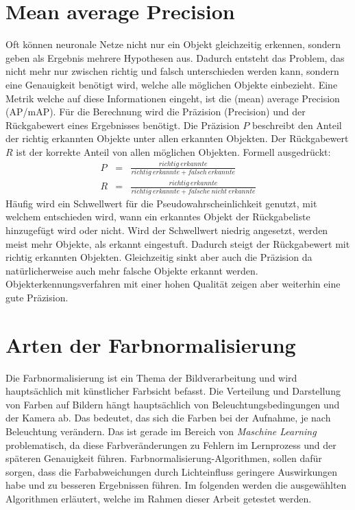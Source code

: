   \section{Mean average Precision}\label{s.map}
Oft können neuronale Netze nicht nur ein Objekt gleichzeitig erkennen, sondern geben als Ergebnis mehrere Hypothesen aus. Dadurch entsteht das Problem, das nicht mehr nur zwischen richtig und falsch unterschieden werden kann, sondern eine Genauigkeit benötigt wird, welche alle möglichen Objekte einbezieht. Eine Metrik welche auf diese Informationen eingeht, ist die (mean) average Precision (AP/mAP). Für die Berechnung wird die Präzision (Precision) und der Rückgabewert eines Ergebnisses benötigt. Die Präzision $P$ beschreibt den Anteil der richtig erkannten Objekte unter allen erkannten Objekten. Der Rückgabewert $R$ ist der korrekte Anteil von allen möglichen Objekten. Formell ausgedrückt:
\begin{eqnarray}
P&=&\frac{richtig\medspace erkannte}{richtig\medspace erkannte + falsch\medspace erkannte}\\
R&=&\frac{richtig\medspace erkannte}{richtig\medspace erkannte + falsche\medspace nicht\medspace erkannte}
\end{eqnarray}
Häufig wird ein Schwellwert für die Pseudowahrscheinlichkeit genutzt, mit welchem entschieden wird, wann ein erkanntes Objekt der Rückgabeliste hinzugefügt wird oder nicht. Wird der Schwellwert niedrig angesetzt, werden meist mehr Objekte, als erkannt eingestuft. Dadurch steigt der Rückgabewert mit richtig erkannten Objekten. Gleichzeitig sinkt aber auch die Präzision da natürlicherweise auch mehr falsche Objekte erkannt werden. Objekterkennungsverfahren mit einer hohen Qualität zeigen aber weiterhin eine gute Präzision.
\section{Arten der Farbnormalisierung}\label{s.farbnormalisierungen}
Die Farbnormalisierung ist ein Thema der Bildverarbeitung und wird hauptsächlich mit künstlicher Farbsicht befasst. Die Verteilung und Darstellung von Farben auf Bildern hängt hauptsächlich von Beleuchtungsbedingungen und der Kamera ab. Das bedeutet, das sich die Farben bei der Aufnahme, je nach Beleuchtung verändern. Das ist gerade im Bereich von \textit{Maschine Learning} problematisch, da diese Farbveränderungen zu Fehlern im Lernprozess und der späteren Genauigkeit führen. Farbnormalisierung-Algorithmen, sollen dafür sorgen, dass die Farbabweichungen durch Lichteinfluss geringere Auswirkungen habe und zu besseren Ergebnissen führen. Im folgenden werden die ausgewählten Algorithmen erläutert, welche im Rahmen dieser Arbeit getestet werden.
